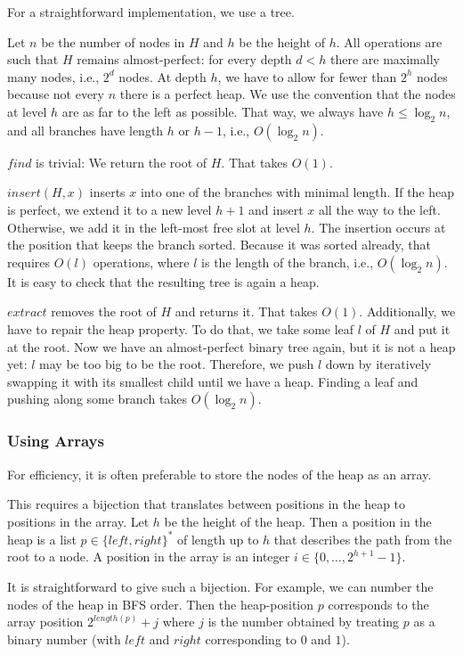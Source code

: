 For a straightforward implementation, we use a tree.

Let $n$ be the number of nodes in $H$ and $h$ be the height of $h$.
All operations are such that $H$ remains almost-perfect: for every depth $d<h$ there are maximally many nodes, i.e., $2^d$ nodes.
At depth $h$, we have to allow for fewer than $2^h$ nodes because not every $n$ there is a perfect heap.
We use the convention that the nodes at level $h$ are as far to the left as possible.
That way, we always have $h\leq\log_2 n$, and all branches have length $h$ or $h-1$, i.e., $O(\log_2 n)$.

$find$ is trivial: We return the root of $H$. That takes $O(1)$.

$insert(H,x)$ inserts $x$ into one of the branches with minimal length.
If the heap is perfect, we extend it to a new level $h+1$ and insert $x$ all the way to the left.
Otherwise, we add it in the left-most free slot at level $h$.
The insertion occurs at the position that keeps the branch sorted.
Because it was sorted already, that requires $O(l)$ operations, where $l$ is the length of the branch, i.e., $O(\log_2 n)$.
It is easy to check that the resulting tree is again a heap.

$extract$ removes the root of $H$ and returns it.
That takes $O(1)$.
Additionally, we have to repair the heap property.
To do that, we take some leaf $l$ of $H$ and put it at the root.
Now we have an almost-perfect binary tree again, but it is not a heap yet: $l$ may be too big to be the root.
Therefore, we push $l$ down by iteratively swapping it with its smallest child until we have a heap.
Finding a leaf and pushing along some branch takes $O(\log_2 n)$.

\subsubsection{Using Arrays}

For efficiency, it is often preferable to store the nodes of the heap as an array.

This requires a bijection that translates between positions in the heap to positions in the array.
Let $h$ be the height of the heap.
Then a position in the heap is a list $p\in\{left,right\}^*$ of length up to $h$ that describes the path from the root to a node.
A position in the array is an integer $i\in\{0,\ldots,2^{h+1}-1\}$.

It is straightforward to give such a bijection.
For example, we can number the nodes of the heap in BFS order.
Then the heap-position $p$ corresponds to the array position $2^{length(p)}+j$ where $j$ is the number obtained by treating $p$ as a binary number (with $left$ and $right$ corresponding to $0$ and $1$).

